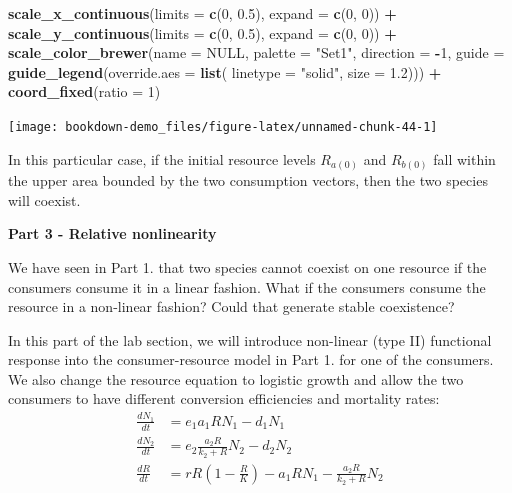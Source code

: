 \documentclass[
]{book}
\newenvironment{Shaded}{\begin{snugshade}}{\end{snugshade}}
\newcommand{\AttributeTok}[1]{\textcolor[rgb]{0.13,0.29,0.53}{#1}}
\newcommand{\ConstantTok}[1]{\textcolor[rgb]{0.56,0.35,0.01}{#1}}
\newcommand{\DecValTok}[1]{\textcolor[rgb]{0.00,0.00,0.81}{#1}}
\newcommand{\FloatTok}[1]{\textcolor[rgb]{0.00,0.00,0.81}{#1}}
\newcommand{\FunctionTok}[1]{\textcolor[rgb]{0.13,0.29,0.53}{\textbf{#1}}}
\newcommand{\NormalTok}[1]{#1}
\newcommand{\SpecialCharTok}[1]{\textcolor[rgb]{0.81,0.36,0.00}{\textbf{#1}}}
\newcommand{\StringTok}[1]{\textcolor[rgb]{0.31,0.60,0.02}{#1}}
\begin{document}
\begin{Shaded}
\begin{Highlighting}[]
  \FunctionTok{scale\_x\_continuous}\NormalTok{(}\AttributeTok{limits =} \FunctionTok{c}\NormalTok{(}\DecValTok{0}\NormalTok{, }\FloatTok{0.5}\NormalTok{), }\AttributeTok{expand =} \FunctionTok{c}\NormalTok{(}\DecValTok{0}\NormalTok{, }\DecValTok{0}\NormalTok{)) }\SpecialCharTok{+}
  \FunctionTok{scale\_y\_continuous}\NormalTok{(}\AttributeTok{limits =} \FunctionTok{c}\NormalTok{(}\DecValTok{0}\NormalTok{, }\FloatTok{0.5}\NormalTok{), }\AttributeTok{expand =} \FunctionTok{c}\NormalTok{(}\DecValTok{0}\NormalTok{, }\DecValTok{0}\NormalTok{)) }\SpecialCharTok{+}
  \FunctionTok{scale\_color\_brewer}\NormalTok{(}\AttributeTok{name =} \ConstantTok{NULL}\NormalTok{, }\AttributeTok{palette =} \StringTok{"Set1"}\NormalTok{, }\AttributeTok{direction =} \SpecialCharTok{{-}}\DecValTok{1}\NormalTok{,}
                     \AttributeTok{guide =} \FunctionTok{guide\_legend}\NormalTok{(}\AttributeTok{override.aes =} \FunctionTok{list}\NormalTok{(}
                       \AttributeTok{linetype =} \StringTok{"solid"}\NormalTok{, }\AttributeTok{size =} \FloatTok{1.2}\NormalTok{))) }\SpecialCharTok{+}
  \FunctionTok{coord\_fixed}\NormalTok{(}\AttributeTok{ratio =} \DecValTok{1}\NormalTok{)}
\end{Highlighting}
\end{Shaded}

\begin{center}\texttt{[image: bookdown-demo\_files/figure-latex/unnamed-chunk-44-1]} \end{center}

In this particular case, if the initial resource levels \(R_{a(0)}\) and \(R_{b(0)}\) fall within the upper area bounded by the two consumption vectors, then the two species will coexist.

\textbf{Part 3 - Relative nonlinearity}

We have seen in Part 1. that two species cannot coexist on one resource if the consumers consume it in a linear fashion. What if the consumers consume the resource in a non-linear fashion? Could that generate stable coexistence?

In this part of the lab section, we will introduce non-linear (type II) functional response into the consumer-resource model in Part 1. for one of the consumers. We also change the resource equation to logistic growth and allow the two consumers to have different conversion efficiencies and mortality rates:
\begin{align*}
\frac {dN_{1}}{dt} &= e_{1}a_{1}RN_{1}-d_{1}N_{1}\\
\frac {dN_{2}}{dt} &= e_{2}\frac{a_{2}R}{k_{2}+R}N_{2}-d_{2}N_{2}\\
\frac {dR}{dt} &= rR(1-\frac{R}{K})-a_{1}RN_{1}-\frac{a_{2}R}{k_{2}+R}N_{2}\\
\end{align*}
\end{document}

